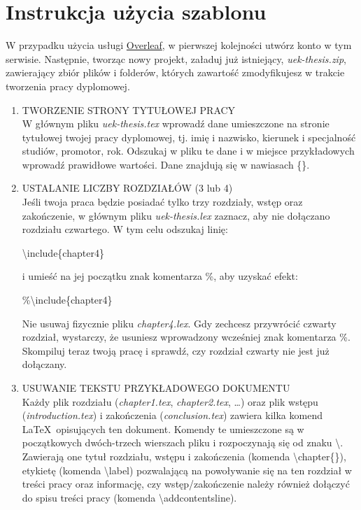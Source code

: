 
\section*{Instrukcja użycia szablonu}

W przypadku użycia usługi \href{https://www.overleaf.com/}{Overleaf}, w pierwszej kolejności utwórz konto w tym serwisie. Następnie, tworząc nowy projekt, załaduj już istniejący, \textit{uek-thesis.zip}, zawierający zbiór plików i folderów, których zawartość zmodyfikujesz w trakcie tworzenia pracy dyplomowej. 

\begin{enumerate}
	
	\item TWORZENIE STRONY TYTUŁOWEJ PRACY\\
	W głównym pliku \textit{uek-thesis.tex} wprowadź dane umieszczone na stronie tytułowej twojej pracy dyplomowej, tj. imię i nazwisko, kierunek i specjalność studiów, promotor, rok. Odszukaj w pliku te dane i w miejsce przykładowych wprowadź prawidłowe wartości. Dane znajdują się w nawiasach \{\}. 
	
	\item USTALANIE LICZBY ROZDZIAŁÓW (3 lub 4)\\
	Jeśli twoja praca będzie posiadać tylko trzy rozdziały, wstęp oraz zakończenie, w głównym pliku \textit{uek-thesis.lex} zaznacz, aby nie dołączano rozdziału czwartego. W tym celu odszukaj linię:
	
	\textbackslash include\{chapter4\}
	
	i umieść na jej początku znak komentarza \%, aby uzyskać efekt:
	
	\%\textbackslash include\{chapter4\}
	
	Nie usuwaj fizycznie pliku \textit{chapter4.lex}. Gdy zechcesz przywrócić czwarty rozdział, wystarczy, że usuniesz wprowadzony wcześniej znak komentarza \%. Skompiluj teraz twoją pracę i sprawdź, czy rozdział czwarty nie jest już dołączany.
	
	\item USUWANIE TEKSTU PRZYKŁADOWEGO DOKUMENTU\\
	Każdy plik rozdziału (\textit{chapter1.tex}, \textit{chapter2.tex}, \ldots) oraz plik wstępu (\textit{introduction.tex}) i zakończenia (\textit{conclusion.tex}) zawiera kilka komend \LaTeX~opisujących ten dokument. Komendy te umieszczone są w początkowych dwóch-trzech wierszach pliku i rozpoczynają się od znaku \textbackslash. Zawierają one tytuł rozdziału, wstępu i zakończenia (komenda \textbackslash chapter\{\}), etykietę (komenda \textbackslash label) pozwalającą na powoływanie się na ten rozdział w treści pracy oraz informację, czy wstęp/zakończenie należy również dołączyć do spisu treści pracy (komenda \textbackslash addcontentsline). 
	

\end{enumerate}
